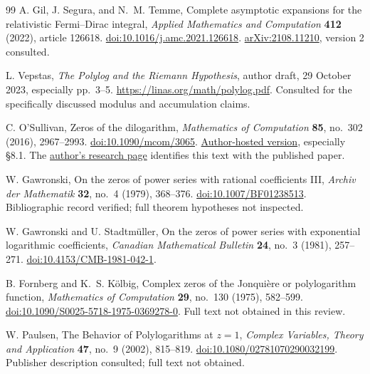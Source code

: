 \documentclass[11pt,a4paper]{article}
\numberwithin{equation}{section}
\theoremstyle{definition}
\theoremstyle{remark}
\begin{document}
\begin{thebibliography}{99}
A. Gil, J. Segura, and N.~M. Temme,
Complete asymptotic expansions for the relativistic Fermi--Dirac integral,
\emph{Applied Mathematics and Computation}
\textbf{412} (2022), article 126618.
\href{https://doi.org/10.1016/j.amc.2021.126618}
{doi:10.1016/j.amc.2021.126618}.
\href{https://arxiv.org/abs/2108.11210}
{arXiv:2108.11210}, version 2 consulted.

L. Vepstas,
\emph{The Polylog and the Riemann Hypothesis},
author draft, 29 October 2023, especially pp.~3--5.
\url{https://linas.org/math/polylog.pdf}.
Consulted for the specifically discussed modulus and accumulation claims.

C. O'Sullivan,
Zeros of the dilogarithm,
\emph{Mathematics of Computation}
\textbf{85}, no.~302 (2016), 2967--2993.
\href{https://doi.org/10.1090/mcom/3065}{doi:10.1090/mcom/3065}.
\href{https://fsw01.bcc.cuny.edu/cormac.osullivan/Research/dilog_zeros_final.pdf}
{Author-hosted version}, especially \S8.1.
The \href{https://fsw01.bcc.cuny.edu/cormac.osullivan/Research/research.htm}
{author's research page} identifies this text with the published paper.

W. Gawronski,
On the zeros of power series with rational coefficients III,
\emph{Archiv der Mathematik}
\textbf{32}, no.~4 (1979), 368--376.
\href{https://doi.org/10.1007/BF01238513}
{doi:10.1007/BF01238513}.
Bibliographic record verified; full theorem hypotheses not inspected.

W. Gawronski and U. Stadtm\"uller,
On the zeros of power series with exponential logarithmic coefficients,
\emph{Canadian Mathematical Bulletin}
\textbf{24}, no.~3 (1981), 257--271.
\href{https://doi.org/10.4153/CMB-1981-042-1}
{doi:10.4153/CMB-1981-042-1}.

B. Fornberg and K.~S. K\"olbig,
Complex zeros of the Jonquière or polylogarithm function,
\emph{Mathematics of Computation}
\textbf{29}, no.~130 (1975), 582--599.
\href{https://doi.org/10.1090/S0025-5718-1975-0369278-0}
{doi:10.1090/S0025-5718-1975-0369278-0}.
Full text not obtained in this review.

W. Paulsen,
The Behavior of Polylogarithms at $z=1$,
\emph{Complex Variables, Theory and Application}
\textbf{47}, no.~9 (2002), 815--819.
\href{https://doi.org/10.1080/02781070290032199}
{doi:10.1080/02781070290032199}.
Publisher description consulted; full text not obtained.

\end{thebibliography}
\end{document}
